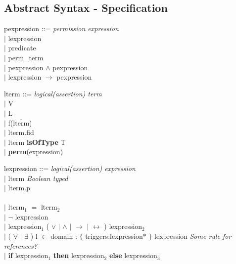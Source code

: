 \documentclass{paper}
\begin{document}
	\subsection{Abstract Syntax - Specification}

	\begin{tabbing}
 			pexpression ::= \textit{\color{grey} permission expression }\\
 			\indent $|$ lexpression \\
 			\indent $|$ predicate \\ %
 			\indent $|$ perm\_term \\
 			\indent $|$ pexpression $\land$ pexpression \\%
 			\indent $|$ lexpression $\rightarrow$ pexpression \\
	\end{tabbing}

	\begin{tabbing}
 			lterm ::= \textit{\color{grey} logical(assertion) term }\\
 			\indent $|$ V \\
 			\indent $|$ L \\
 			\indent $|$ f($\overline{\mathrm{lterm}}$) \\
 			\indent $|$ lterm.fid \\
 			\indent $|$ lterm \textbf{isOfType} T \\
 			\indent $|$ \textbf{perm}(expression) \\
	\end{tabbing}

	\begin{tabbing}
 			lexpression ::= \textit{\color{grey} logical(assertion) expression }\\ 
 			\indent $|$ lterm    \textit{\color{grey}Boolean typed}\\
 			\indent $|$ lterm.p\\
 			\\
 			\indent $|$ lterm$_1$ $=$ lterm$_2$ \\
 			\indent $|$ $\lnot$ lexpression \\
 			\indent $|$ lexpression$_1$ ( $\lor$ $|$ $\land$ $|$ $\rightarrow$ $|$ $\leftrightarrow$ ) lexpression$_2$ \\
 			\indent $|$ ( $\forall$ $|$ $\exists$ ) l $\in$ domain : $\{$ triggers:lexpression$\ast$ $\}$ lexpression \textit{\color{grey}Some rule for references?} \\
 			\indent $|$ \textbf{if} lexpression$_1$ \textbf{then} lexpression$_2$ \textbf{else} lexpression$_3$\\
	\end{tabbing}
\end{document}
